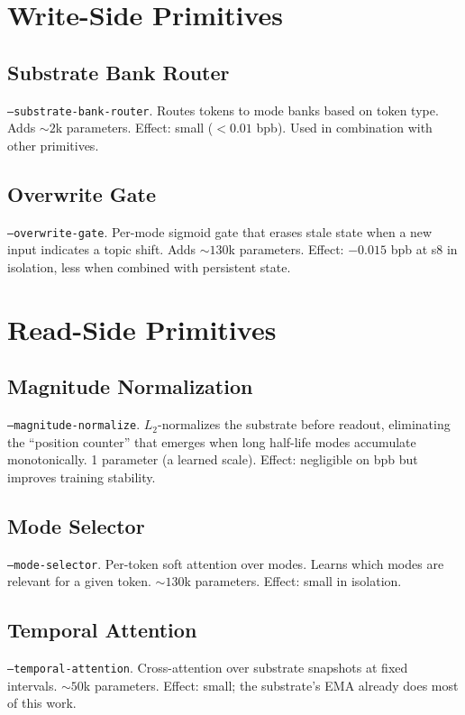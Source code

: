 \documentclass[11pt,openany]{book}
\theoremstyle{definition}
\theoremstyle{plain}
\begin{document}
\section{Write-Side Primitives}

\subsection{Substrate Bank Router}
\texttt{--substrate-bank-router}. Routes tokens to mode banks based on
token type. Adds $\sim 2$k parameters. Effect: small ($< 0.01$ bpb).
Used in combination with other primitives.

\subsection{Overwrite Gate}
\texttt{--overwrite-gate}. Per-mode sigmoid gate that erases stale state
when a new input indicates a topic shift. Adds $\sim 130$k parameters.
Effect: $-0.015$ bpb at s8 in isolation, less when combined with persistent
state.

\section{Read-Side Primitives}

\subsection{Magnitude Normalization}
\texttt{--magnitude-normalize}. $L_2$-normalizes the substrate before
readout, eliminating the ``position counter'' that emerges when long
half-life modes accumulate monotonically. 1 parameter (a learned scale).
Effect: negligible on bpb but improves training stability.

\subsection{Mode Selector}
\texttt{--mode-selector}. Per-token soft attention over modes. Learns
which modes are relevant for a given token. $\sim 130$k parameters.
Effect: small in isolation.

\subsection{Temporal Attention}
\texttt{--temporal-attention}. Cross-attention over substrate snapshots
at fixed intervals. $\sim 50$k parameters. Effect: small; the substrate's
EMA already does most of this work.
\end{document}
